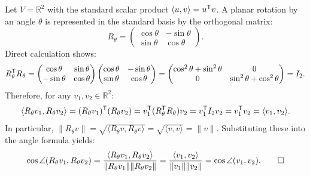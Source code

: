\begin{exercisesolution}
\label{sol:rotation_invariance_angle}
Let $V = \mathbb{R}^2$ with the standard scalar product $\langle u, v \rangle = u^{\mathsf{T}} v$.
A planar rotation by an angle $\theta$ is represented in the standard basis by the orthogonal matrix:
\[
R_\theta = \begin{pmatrix} \cos\theta & -\sin\theta \\ \sin\theta & \cos\theta \end{pmatrix}.
\]
Direct calculation shows:
\[
R_\theta^{\mathsf{T}} R_\theta = \begin{pmatrix} \cos\theta & \sin\theta \\ -\sin\theta & \cos\theta \end{pmatrix} \begin{pmatrix} \cos\theta & -\sin\theta \\ \sin\theta & \cos\theta \end{pmatrix} = \begin{pmatrix} \cos^2\theta + \sin^2\theta & 0 \\ 0 & \sin^2\theta + \cos^2\theta \end{pmatrix} = I_2.
\]
Therefore, for any $v_1, v_2 \in \mathbb{R}^2$:
\[
\langle R_\theta v_1, R_\theta v_2 \rangle = (R_\theta v_1)^{\mathsf{T}} (R_\theta v_2) = v_1^{\mathsf{T}} (R_\theta^{\mathsf{T}} R_\theta) v_2 = v_1^{\mathsf{T}} I_2 v_2 = v_1^{\mathsf{T}} v_2 = \langle v_1, v_2 \rangle.
\]
In particular, $\|R_\theta v\| = \sqrt{\langle R_\theta v, R_\theta v \rangle} = \sqrt{\langle v, v \rangle} = \|v\|$.
Substituting these into the angle formula yields:
\[
\cos \angle(R_\theta v_1, R_\theta v_2) = \frac{\langle R_\theta v_1, R_\theta v_2 \rangle}{\|R_\theta v_1\| \|R_\theta v_2\|} = \frac{\langle v_1, v_2 \rangle}{\|v_1\| \|v_2\|} = \cos \angle(v_1, v_2). \qedhere
\]
\end{exercisesolution}

